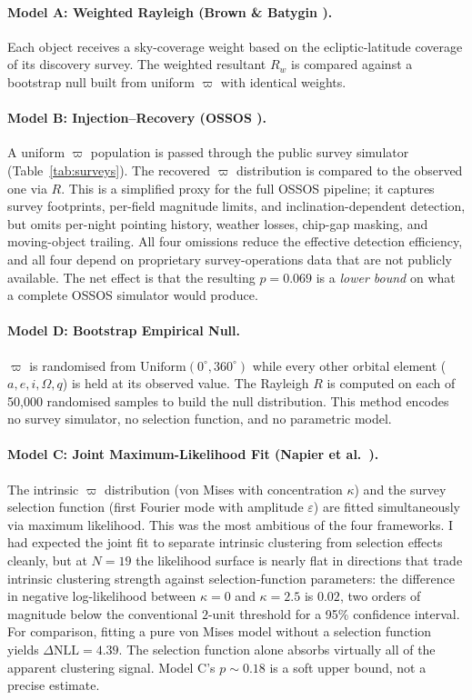 \documentclass[usenatbib]{mnras}
\begin{document}
\paragraph{Model A: Weighted Rayleigh (Brown \& Batygin \cite{brown2019}).}
Each object receives a sky-coverage weight based on the ecliptic-latitude coverage of its discovery survey. The weighted resultant $R_w$ is compared against a bootstrap null built from uniform $\varpi$ with identical weights.

\paragraph{Model B: Injection--Recovery (OSSOS \cite{shankman2017}).}
A uniform $\varpi$ population is passed through the public survey simulator (Table~\ref{tab:surveys}). The recovered $\varpi$ distribution is compared to the observed one via $R$. This is a simplified proxy for the full OSSOS pipeline; it captures survey footprints, per-field magnitude limits, and inclination-dependent detection, but omits per-night pointing history, weather losses, chip-gap masking, and moving-object trailing. All four omissions reduce the effective detection efficiency, and all four depend on proprietary survey-operations data that are not publicly available. The net effect is that the resulting $p=0.069$ is a \textit{lower bound} on what a complete OSSOS simulator would produce.

\paragraph{Model D: Bootstrap Empirical Null.}
$\varpi$ is randomised from $\mathrm{Uniform}(0^\circ, 360^\circ)$ while every other orbital element ($a, e, i, \Omega, q$) is held at its observed value. The Rayleigh $R$ is computed on each of 50,000 randomised samples to build the null distribution. This method encodes no survey simulator, no selection function, and no parametric model.

\paragraph{Model C: Joint Maximum-Likelihood Fit (Napier et al.\ \cite{napier2021}).}
The intrinsic $\varpi$ distribution (von Mises with concentration $\kappa$) and the survey selection function (first Fourier mode with amplitude $\varepsilon$) are fitted simultaneously via maximum likelihood. This was the most ambitious of the four frameworks. I had expected the joint fit to separate intrinsic clustering from selection effects cleanly, but at $N=19$ the likelihood surface is nearly flat in directions that trade intrinsic clustering strength against selection-function parameters: the difference in negative log-likelihood between $\kappa=0$ and $\kappa=2.5$ is $0.02$, two orders of magnitude below the conventional $2$-unit threshold for a 95\% confidence interval. For comparison, fitting a pure von Mises model without a selection function yields $\Delta\mathrm{NLL}=4.39$. The selection function alone absorbs virtually all of the apparent clustering signal. Model C's $p\sim0.18$ is a soft upper bound, not a precise estimate.
\end{document}
